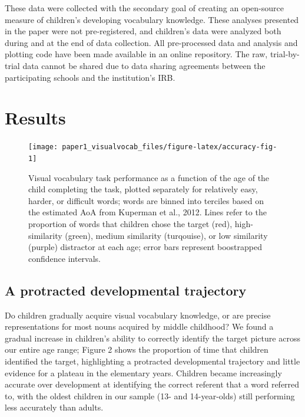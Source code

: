 \documentclass[
  man,mask]{apa6}
\begin{document}
These data were collected with the secondary goal of creating an open-source measure of children's developing vocabulary knowledge. These analyses presented in the paper were not pre-registered, and children's data were analyzed both during and at the end of data collection. All pre-processed data and analysis and plotting code have been made available in an online repository. The raw, trial-by-trial data cannot be shared due to data sharing agreements between the participating schools and the institution's IRB.

\section{Results}\label{results}

\begin{figure}[H]

{\centering \texttt{[image: paper1\_visualvocab\_files/figure-latex/accuracy-fig-1]} 

}

\caption{Visual vocabulary task performance as a function of the age of the child completing the task, plotted separately for relatively easy, harder, or difficult words; words are binned into terciles based on the estimated AoA from Kuperman et al., 2012. Lines refer to the proportion of words that children chose the target (red), high-similarity (green), medium similarity (turqouise), or low similarity (purple) distractor  at each age; error bars represent boostrapped confidence intervals.}\label{fig:accuracy-fig}
\end{figure}

\subsection{A protracted developmental trajectory}\label{a-protracted-developmental-trajectory}

Do children gradually acquire visual vocabulary knowledge, or are precise representations for most nouns acquired by middle childhood? We found a gradual increase in children's ability to correctly identify the target picture across our entire age range; Figure 2 shows the proportion of time that children identified the target, highlighting a protracted developmental trajectory and little evidence for a plateau in the elementary years. Children became increasingly accurate over development at identifying the correct referent that a word referred to, with the oldest children in our sample (13- and 14-year-olds) still performing less accurately than adults.
\end{document}
